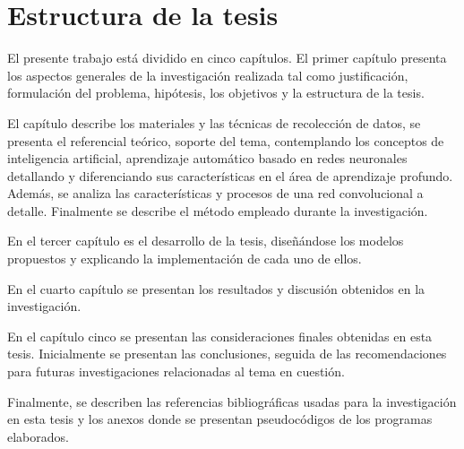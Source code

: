 \section{Estructura de la tesis}

	\vskip 0.1cm
	El presente trabajo está dividido en cinco capítulos. El primer capítulo presenta los aspectos generales de la investigación realizada tal como justificación, formulación del problema, hipótesis, los objetivos y la estructura de la tesis.

	El capítulo describe los materiales y las técnicas de recolección de datos, se presenta el referencial teórico, soporte del tema, contemplando los conceptos de inteligencia artificial, aprendizaje automático basado en redes neuronales detallando y diferenciando sus características en el área de aprendizaje profundo. Además, se analiza las características y procesos de una red convolucional a detalle. Finalmente se describe el método empleado durante la investigación.

	En el tercer capítulo es el desarrollo de la tesis, diseñándose los modelos propuestos y explicando la implementación de cada uno de ellos.
	
	En el cuarto capítulo se presentan los resultados y discusión obtenidos en la investigación.

	En el capítulo cinco se presentan las consideraciones finales obtenidas en esta tesis. Inicialmente se presentan las conclusiones, seguida de las recomendaciones para futuras investigaciones relacionadas al tema en cuestión.

	Finalmente, se describen las referencias bibliográficas usadas para la investigación en esta tesis y los anexos donde se presentan pseudocódigos de los programas elaborados.

